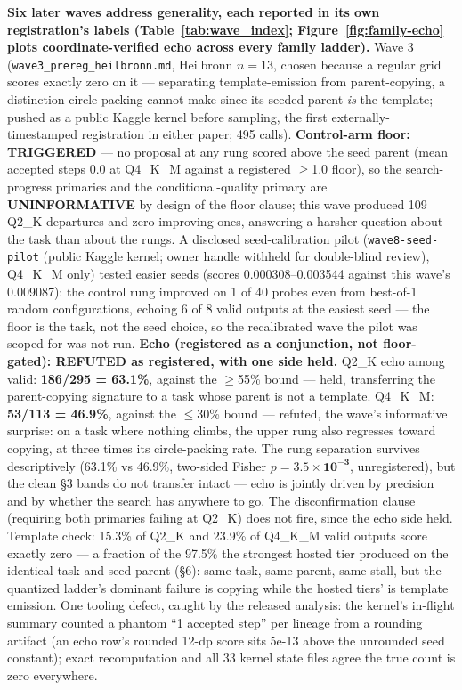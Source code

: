 \textbf{Six later waves address generality, each reported in its own registration's labels (Table~\ref{tab:wave_index}; Figure~\ref{fig:family-echo} plots coordinate-verified echo across every family ladder).} Wave 3 (\texttt{wave3\_prereg\_heilbronn.md}, Heilbronn $n = 13$, chosen because a regular grid scores exactly zero on it --- separating template-emission from parent-copying, a distinction circle packing cannot make since its seeded parent \emph{is} the template; pushed as a public Kaggle kernel before sampling, the first externally-timestamped registration in either paper; 495 calls). \textbf{Control-arm floor: TRIGGERED} --- no proposal at any rung scored above the seed parent (mean accepted steps 0.0 at Q4\_K\_M against a registered $\ge$1.0 floor), so the search-progress primaries and the conditional-quality primary are \textbf{UNINFORMATIVE} by design of the floor clause; this wave produced 109 Q2\_K departures and zero improving ones, answering a harsher question about the task than about the rungs. A disclosed seed-calibration pilot (\texttt{wave8-seed-pilot} (public Kaggle kernel; owner handle withheld for double-blind review), Q4\_K\_M only) tested easier seeds (scores 0.000308--0.003544 against this wave's 0.009087): the control rung improved on 1 of 40 probes even from best-of-1 random configurations, echoing 6 of 8 valid outputs at the easiest seed --- the floor is the task, not the seed choice, so the recalibrated wave the pilot was scoped for was not run. \textbf{Echo (registered as a conjunction, not floor-gated): REFUTED as registered, with one side held.} Q2\_K echo among valid: \textbf{186/295 = 63.1\%}, against the $\ge$55\% bound --- held, transferring the parent-copying signature to a task whose parent is not a template. Q4\_K\_M: \textbf{53/113 = 46.9\%}, against the $\le$30\% bound --- refuted, the wave's informative surprise: on a task where nothing climbs, the upper rung also regresses toward copying, at three times its circle-packing rate. The rung separation survives descriptively (63.1\% vs 46.9\%, two-sided Fisher $p = \mathbf{3.5\times10^{-3}}$, unregistered), but the clean \S3 bands do not transfer intact --- echo is jointly driven by precision and by whether the search has anywhere to go. The disconfirmation clause (requiring both primaries failing at Q2\_K) does not fire, since the echo side held. Template check: 15.3\% of Q2\_K and 23.9\% of Q4\_K\_M valid outputs score exactly zero --- a fraction of the 97.5\% the strongest hosted tier produced on the identical task and seed parent (\S6): same task, same parent, same stall, but the quantized ladder's dominant failure is copying while the hosted tiers' is template emission. One tooling defect, caught by the released analysis: the kernel's in-flight summary counted a phantom ``1 accepted step'' per lineage from a rounding artifact (an echo row's rounded 12-dp score sits 5e-13 above the unrounded seed constant); exact recomputation and all 33 kernel state files agree the true count is zero everywhere.

